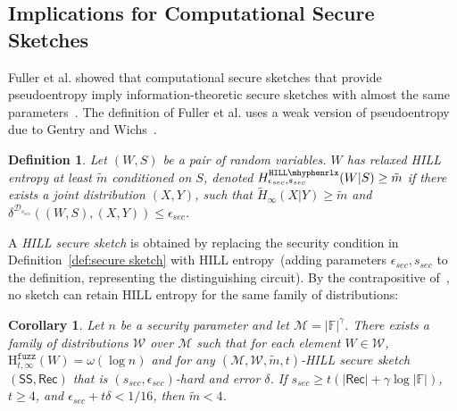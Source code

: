 \documentclass[11pt]{article}
\newcommand{\defref}[1]{\mbox{Definition~\ref{#1}}}
\newcommand{\class}[1]{{\ensuremath{\mathsf{#1}}}}
\newcommand{\sketch}{\ensuremath{\class{SS}}\xspace}
\newcommand{\rec}{\ensuremath{\class{Rec}}\xspace}
\newcommand{\hillrlx}{\ensuremath{\mathtt{HILL\mhyphen rlx}}\xspace}
\newcommand{\Hfuzz}{\mathrm{H}^{\mathtt{fuzz}}_{t,\infty}}
\newtheorem{corollary}[theorem]{Corollary}
\newtheorem{definition}[theorem]{Definition}
\begin{document}
\subsection{Implications for Computational Secure Sketches}
\label{sec:feas comp sec sketch}
Fuller et al. showed that computational secure sketches that provide pseudoentropy imply information-theoretic secure sketches with almost the same parameters~\cite[Corollary 3.8]{fuller2013computational}.  %
The definition of Fuller et al. uses a weak version of pseudoentropy~\cite{DBLP:journals/siamcomp/HastadILL99} due to Gentry and Wichs~\cite{gentry2011separating}.

\begin{definition}
\label{def:relaxed hill}
Let $(W, S)$ be a pair of random variables.  $W$ has 
\emph{relaxed HILL entropy} at least $\tilde{m}$ conditioned on $S$,
denoted $H^{\hillrlx}_{\epsilon_{sec}, s_{sec}}(W|S)\geq \tilde{m}$ if there exists a joint distribution $(X, Y)$, such that $\tilde{H}_\infty(X|Y)\geq \tilde{m}$ and $\delta^{\mathcal{D}_{s_{sec}}} ((W, S),(X,Y))\leq \epsilon_{sec}$.
\end{definition}

A \emph{HILL secure sketch} is obtained by replacing the security condition in \defref{def:secure sketch} with HILL entropy~(adding parameters $\epsilon_{sec}, s_{sec}$ to the definition, representing the distinguishing circuit).  By the contrapositive of~\cite[Corollary 3.8]{fuller2013computational}, no sketch can retain HILL entropy for the same family of distributions:

\begin{corollary}
\label{cor:imposs comp sketch}
Let $n$ be a security parameter and let $\mathcal{M} = |\mathbb{F}|^\gamma$.  There exists a family of distributions $\mathcal{W}$ over $\mathcal{M}$ such that for each element $W\in \mathcal{W}$, $\Hfuzz(W)= \omega(\log n)$ and for any $(\mathcal{M}, \mathcal{W}, \tilde{m}, t)$-HILL secure sketch $(\sketch, \rec)$ that is $(s_{sec}, \epsilon_{sec})$-hard and error $\delta$.  If 
$s_{sec}\ge t(|\rec| + \gamma \log |\mathbb{F}|)$, 
$t\ge 4$, and 
 $\epsilon_{sec} + t\delta < 1/16$,
 then $\tilde{m} <4$.
\end{corollary}


\end{document}
